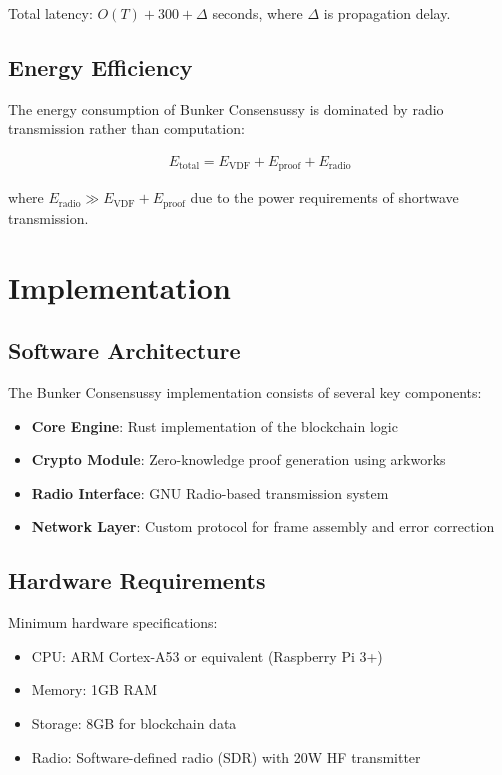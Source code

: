 \documentclass[11pt,a4paper]{article}
\begin{document}
Total latency: $O(T) + 300 + \Delta$ seconds, where $\Delta$ is propagation delay.

\subsection{Energy Efficiency}

The energy consumption of Bunker Consensussy is dominated by radio transmission rather than computation:

\begin{align}
E_{\text{total}} = E_{\text{VDF}} + E_{\text{proof}} + E_{\text{radio}}
\end{align}

where $E_{\text{radio}} \gg E_{\text{VDF}} + E_{\text{proof}}$ due to the power requirements of shortwave transmission.

\section{Implementation}

\subsection{Software Architecture}

The Bunker Consensussy implementation consists of several key components:

\begin{itemize}
\item \textbf{Core Engine}: Rust implementation of the blockchain logic
\item \textbf{Crypto Module}: Zero-knowledge proof generation using arkworks
\item \textbf{Radio Interface}: GNU Radio-based transmission system
\item \textbf{Network Layer}: Custom protocol for frame assembly and error correction
\end{itemize}

\subsection{Hardware Requirements}

Minimum hardware specifications:
\begin{itemize}
\item CPU: ARM Cortex-A53 or equivalent (Raspberry Pi 3+)
\item Memory: 1GB RAM
\item Storage: 8GB for blockchain data
\item Radio: Software-defined radio (SDR) with 20W HF transmitter
\end{itemize}
\end{document}
